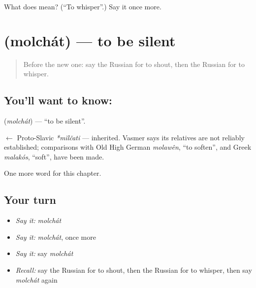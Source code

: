 \begin{tcolorbox}[breakable,colback=teal!4,colframe=teal!35!black,title={Before you move on}]
What does  mean? (\textquotedblleft{}To whisper\textquotedblright{}.) Say it once more.
\end{tcolorbox}
\section[\texorpdfstring{\ru{молчать} (molchát)}{молчать (molchát)}]{ (molchát) — to be silent}

\label{lesson:RU-C235-molchat}



\begin{quote}
Before the new one: say the Russian for to shout, then the Russian for to whisper.
\end{quote}

\subsection*{You'll want to know: }
\textbf{} (\emph{molchát}) — \textquotedblleft{}to be silent\textquotedblright{}.

\begin{cousinweb}
\textbf{} $\leftarrow$ Proto-Slavic \emph{*mĭlčati} — inherited. Vasmer says its relatives are not reliably established; comparisons with Old High German \emph{molawên}, \textquotedblleft{}to soften\textquotedblright{}, and Greek \emph{malakós}, \textquotedblleft{}soft\textquotedblright{}, have been made.
\end{cousinweb}

\begin{grammarlens}[title={What you've built}]
One more word for this chapter.
\end{grammarlens}

\subsection*{Your turn}
\begin{itemize}
\raggedright
  \item \emph{Say it:} \emph{molchát}
  \item \emph{Say it:} \emph{molchát}, once more
  \item \emph{Say it:} say \emph{molchát}
  \item \emph{Recall:} say the Russian for to shout, then the Russian for to whisper, then say \emph{molchát} again
\end{itemize}

